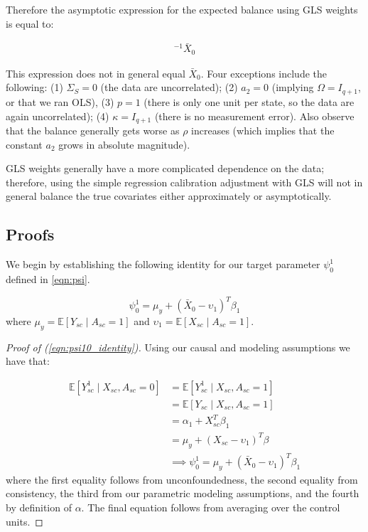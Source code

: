 \begin{remark}
    Therefore the asymptotic expression for the expected balance using GLS weights is equal to:
    
    \begin{align*}
    [a_1\Sigma_X\kappa + a_2(p-1)\Sigma_S\kappa][a_1\Sigma_X\kappa + a_2(p-1)\kappa^T\Sigma_S\kappa]^{-1}\bar{X}_0 
    \end{align*}

    This expression does not in general equal $\bar{X}_0$. Four exceptions include the following: (1) $\Sigma_S = 0$ (the data are uncorrelated); (2) $a_2 = 0$ (implying $\Omega = I_{q+1}$, or that we ran OLS), (3) $p = 1$ (there is only one unit per state, so the data are again uncorrelated); (4) $\kappa = I_{q+1}$ (there is no measurement error). Also observe that the balance generally gets worse as $\rho$ increases (which implies that the constant $a_2$ grows in absolute magnitude).
    
    GLS weights generally have a more complicated dependence on the data; therefore, using the simple regression calibration adjustment with GLS will not in general balance the true covariates either approximately or asymptotically.
\end{remark}


\subsection{Proofs}


We begin by establishing the following identity for our target parameter $\psi_0^1$ defined in \eqref{eqn:psi}.

\begin{equation}\label{eqn:psi10_identity}
\psi^1_0 = \mu_y + (\bar{X}_0 - \upsilon_1)^T\beta_1
\end{equation}
%
where $\mu_y = \mathbb{E}[Y_{sc} \mid A_{sc} = 1]$ and $\upsilon_1 = \mathbb{E}[X_{sc} \mid A_{sc} = 1]$.

\begin{proof}[Proof of (\ref{eqn:psi10_identity})]
Using our causal and modeling assumptions we have that:

\begin{align*}
\mathbb{E}[Y_{sc}^1 \mid X_{sc}, A_{sc} = 0] &= \mathbb{E}[Y_{sc}^1 \mid X_{sc}, A_{sc} = 1] \\
&= \mathbb{E}[Y_{sc} \mid X_{sc}, A_{sc} = 1] \\
&= \alpha_1 + X_{sc}^T\beta_1 \\
&= \mu_y + (X_{sc} - \upsilon_1)^T\beta \\
&\implies \psi_0^1 = \mu_y + (\bar{X}_0 - \upsilon_1)^T\beta_1
\end{align*}
%
where the first equality follows from unconfoundedness, the second equality from consistency, the third from our parametric modeling assumptions, and the fourth by definition of $\alpha$. The final equation follows from averaging over the control units.
\end{proof}
%

